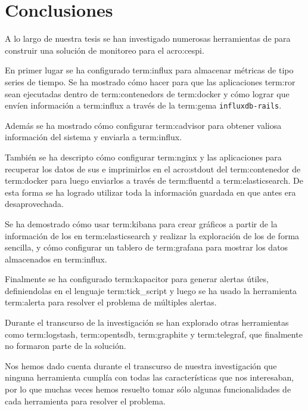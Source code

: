 \newpage
\section{Conclusiones}
\label{conclusiones}

A lo largo de nuestra tesis se han investigado numerosas herramientas de
 para construir una solución de monitoreo para el
\gls{acro:cespi}.

En primer lugar se ha configurado \gls{term:influx} para almacenar métricas de
tipo series de tiempo. Se ha mostrado cómo hacer para que las aplicaciones
\gls{term:ror} sean ejecutadas dentro de \glspl{term:contenedor} de
\gls{term:docker} y cómo lograr que envíen información a \gls{term:influx} a
través de la \gls{term:gema} \texttt{influxdb-rails}.

Además se ha mostrado cómo configurar \gls{term:cadvisor} para
obtener valiosa información del sistema y enviarla a \gls{term:influx}.

También se ha descripto cómo configurar \gls{term:nginx} y las aplicaciones
para recuperar los datos de sus  e imprimirlos en el \gls{acro:stdout}
del \gls{term:contenedor} de \gls{term:docker} para luego enviarlos a
través de \gls{term:fluentd} a \gls{term:elasticsearch}. De esta forma se ha
logrado utilizar toda la información guardada en  que antes era
desaprovechada.

Se ha demostrado cómo usar \gls{term:kibana} para crear gráficos a partir de la
información de los  en \gls{term:elasticsearch} y realizar la exploración
de los  de forma sencilla, y cómo configurar un tablero de
\gls{term:grafana} para mostrar los datos almacenados en \gls{term:influx}.

Finalmente se ha configurado \gls{term:kapacitor} para generar alertas útiles,
definiendolas en el lenguaje \gls{term:tick_script} y luego se ha usado la
herramienta \gls{term:alerta} para resolver el problema de múltiples alertas.

Durante el transcurso de la investigación se han explorado otras
herramientas como \gls{term:logstash}, \gls{term:opentsdb}, \gls{term:graphite}
y \gls{term:telegraf}, que finalmente no formaron parte de la solución.

Nos hemos dado cuenta durante el transcurso de nuestra investigación que
ninguna herramienta cumplía con todas las características que nos interesaban,
por lo que muchas veces hemos resuelto tomar sólo algunas funcionalidades de
cada herramienta para resolver el problema.

